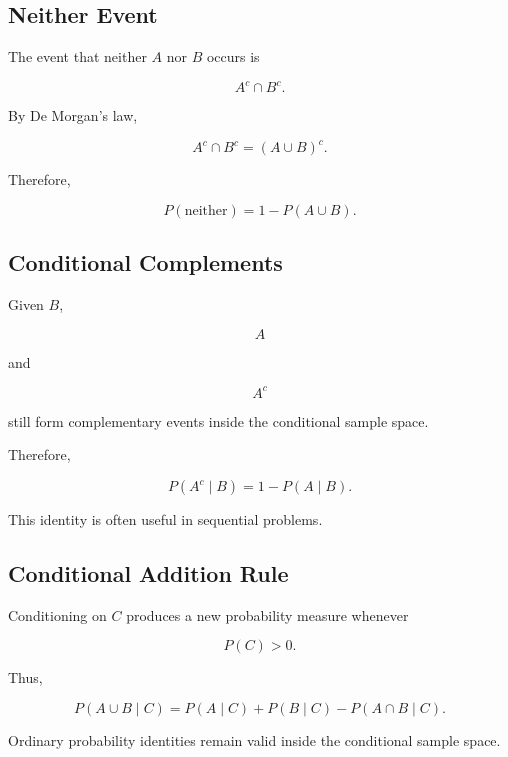\subsection{Neither Event}
\label{subsec:neither-event}

The event that neither \(A\) nor \(B\) occurs is

\[
A^c\cap B^c.
\]

By De Morgan's law,

\[
A^c\cap B^c
=
(A\cup B)^c.
\]

Therefore,

\[
\boxed{
P(\text{neither})
=
1-P(A\cup B).
}
\]

\subsection{Conditional Complements}
\label{subsec:conditional-complements}

Given \(B\),

\[
A
\]

and

\[
A^c
\]

still form complementary events inside the conditional sample space.

Therefore,

\[
\boxed{
P(A^c\mid B)
=
1-P(A\mid B).
}
\]

This identity is often useful in sequential problems.

\subsection{Conditional Addition Rule}
\label{subsec:conditional-addition-rule}

Conditioning on \(C\) produces a new probability measure whenever

\[
P(C)>0.
\]

Thus,

\[
\boxed{
P(A\cup B\mid C)
=
P(A\mid C)
+
P(B\mid C)
-
P(A\cap B\mid C).
}
\]

Ordinary probability identities remain valid inside the conditional
sample space.

